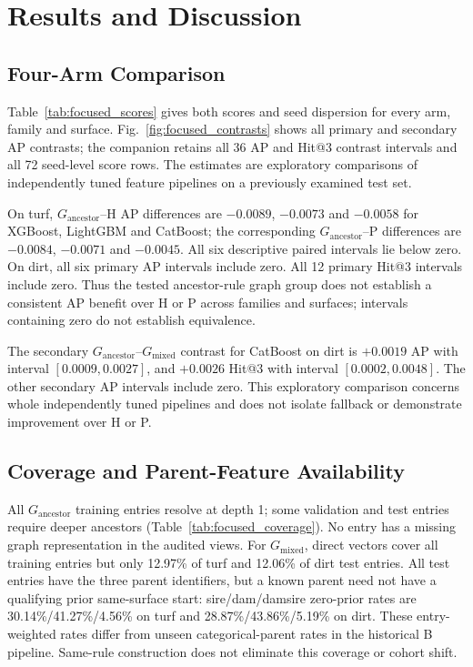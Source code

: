 \section{Results and Discussion}
\subsection{Four-Arm Comparison}
Table~\ref{tab:focused_scores} gives both scores and seed dispersion for every arm, family and surface. Fig.~\ref{fig:focused_contrasts} shows all primary and secondary AP contrasts; the companion retains all 36 AP and Hit@3 contrast intervals and all 72 seed-level score rows. The estimates are exploratory comparisons of independently tuned feature pipelines on a previously examined test set.




On turf, $G_{\mathrm{ancestor}}$--H AP differences are $-0.0089$, $-0.0073$ and $-0.0058$ for XGBoost, LightGBM and CatBoost; the corresponding $G_{\mathrm{ancestor}}$--P differences are $-0.0084$, $-0.0071$ and $-0.0045$. All six descriptive paired intervals lie below zero. On dirt, all six primary AP intervals include zero. All 12 primary Hit@3 intervals include zero. Thus the tested ancestor-rule graph group does not establish a consistent AP benefit over H or P across families and surfaces; intervals containing zero do not establish equivalence.

The secondary $G_{\mathrm{ancestor}}$--$G_{\mathrm{mixed}}$ contrast for CatBoost on dirt is $+0.0019$ AP with interval $[0.0009,0.0027]$, and $+0.0026$ Hit@3 with interval $[0.0002,0.0048]$. The other secondary AP intervals include zero. This exploratory comparison concerns whole independently tuned pipelines and does not isolate fallback or demonstrate improvement over H or P.

\subsection{Coverage and Parent-Feature Availability}
All $G_{\mathrm{ancestor}}$ training entries resolve at depth 1; some validation and test entries require deeper ancestors (Table~\ref{tab:focused_coverage}). No entry has a missing graph representation in the audited views. For $G_{\mathrm{mixed}}$, direct vectors cover all training entries but only 12.97\% of turf and 12.06\% of dirt test entries. All test entries have the three parent identifiers, but a known parent need not have a qualifying prior same-surface start: sire/dam/damsire zero-prior rates are 30.14\%/41.27\%/4.56\% on turf and 28.87\%/43.86\%/5.19\% on dirt. These entry-weighted rates differ from unseen categorical-parent rates in the historical B pipeline. Same-rule construction does not eliminate this coverage or cohort shift.

